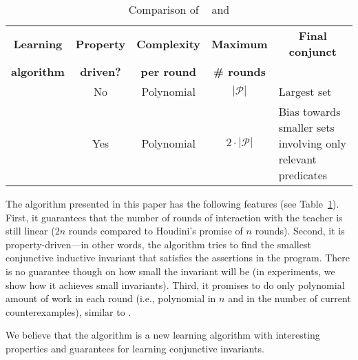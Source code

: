 
\begin{table}[t]
	\caption{Comparison of \houdini~\cite{DBLP:conf/fm/FlanaganL01} and \sorcar} \label{tab:learners_comparison}
	\centering
	\begin{tabular}{l@{\hskip 1em}c@{\hskip 1em}c@{\hskip 1em}c@{\hskip 1em}m{35mm}}
		\toprule
		\multicolumn{1}{c}{\textbf{Learning}} & \textbf{Property} & \textbf{Complexity} & \textbf{Maximum} & \multicolumn{1}{c}{\textbf{Final conjunct}} \\
		\multicolumn{1}{c}{\textbf{algorithm}} & \textbf{driven?} & \textbf{per round} & \textbf{\# rounds} & \\
		\midrule
		\houdini & No & Polynomial & $|\mathcal P|$ & Largest set \\\addlinespace
		\midrule
		\sorcar & Yes & Polynomial & $2 \cdot |\mathcal P|$ & Bias towards smaller sets involving only relevant predicates \\
		\bottomrule
	\end{tabular}
\end{table}

The \sorcar algorithm presented in this paper has the following features (see Table~\ref{tab:learners_comparison}).
First, it guarantees that the number of rounds of interaction with the teacher is still linear ($2n$ rounds compared to Houdini's promise of $n$ rounds).
Second, it is property-driven---in other words, the algorithm tries to find the smallest conjunctive inductive invariant that satisfies the assertions in the program. There is no guarantee though on how small the invariant will be (in experiments, we show how it achieves small invariants).
Third, it promises to do only polynomial amount of work in each round (i.e., polynomial in $n$ and in the number of current counterexamples), similar to \houdini. 

We believe that the \sorcar algorithm is a new learning algorithm with interesting properties and guarantees for learning conjunctive invariants. 


